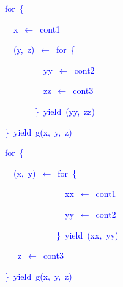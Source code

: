 \texttt{\textcolor{blue}{\footnotesize{}}}%
\begin{minipage}[c][1\totalheight][t]{0.49\columnwidth}%
\begin{lyxcode}
\textcolor{blue}{\footnotesize{}for~\{}{\footnotesize\par}

\textcolor{blue}{\footnotesize{}~~x~$\leftarrow$~cont1}{\footnotesize\par}

\textcolor{blue}{\footnotesize{}~~(y,~z)~$\leftarrow$~for~\{}{\footnotesize\par}

\textcolor{blue}{\footnotesize{}~~~~~~~~~yy~$\leftarrow$~cont2}{\footnotesize\par}

\textcolor{blue}{\footnotesize{}~~~~~~~~~zz~$\leftarrow$~cont3}{\footnotesize\par}

\textcolor{blue}{\footnotesize{}~~~~~~~\}~yield~(yy,~zz)}{\footnotesize\par}

\textcolor{blue}{\footnotesize{}\}~yield~g(x,~y,~z)}{\footnotesize\par}
\end{lyxcode}
%
\end{minipage}\texttt{\textcolor{blue}{\footnotesize{}\hfill{}}}%
\begin{minipage}[c][1\totalheight][t]{0.49\columnwidth}%
\begin{lyxcode}
\textcolor{blue}{\footnotesize{}for~\{}{\footnotesize\par}

\textcolor{blue}{\footnotesize{}~~(x,~y)~$\leftarrow$~for~\{}{\footnotesize\par}

\textcolor{blue}{\footnotesize{}~~~~~~~~~~~~~~xx~$\leftarrow$~cont1}{\footnotesize\par}

\textcolor{blue}{\footnotesize{}~~~~~~~~~~~~~~yy~$\leftarrow$~cont2}{\footnotesize\par}

\textcolor{blue}{\footnotesize{}~~~~~~~~~~~~\}~yield~(xx,~yy)}{\footnotesize\par}

\textcolor{blue}{\footnotesize{}~~~z~$\leftarrow$~cont3}{\footnotesize\par}

\textcolor{blue}{\footnotesize{}\}~yield~g(x,~y,~z)}{\footnotesize\par}
\end{lyxcode}
%
\end{minipage}\texttt{\textcolor{blue}{\footnotesize{}\hfill{}\medskip{}
}}{\footnotesize\par}

